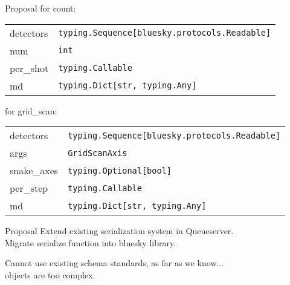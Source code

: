 \documentclass{presentation}
\begin{document}
\begin{frame}{Proposal}
  for count:
  \begin{tabular}{ l | l }
    detectors & \texttt{typing.Sequence[bluesky.protocols.Readable]} \\
    num & \texttt{int} \\
    per\_shot & \texttt{typing.Callable} \\
    md & \texttt{typing.Dict[str, typing.Any]} \\
  \end{tabular}

  \vfill

  for grid\_scan:
  \begin{tabular}{ l | l }
    detectors & \texttt{typing.Sequence[bluesky.protocols.Readable]} \\
    args & \texttt{GridScanAxis} \\
    snake\_axes & \texttt{typing.Optional[bool]} \\
    per\_step & \texttt{typing.Callable} \\
    md & \texttt{typing.Dict[str, typing.Any]} \\
  \end{tabular}
\end{frame}

\begin{frame}{Proposal}
  Extend existing serialization system in Queueserver. \\
  Migrate serialize function into bluesky library.

  \vfill

  Cannot use existing schema standards, as far as we know... \\
  objects are too complex.

  \vfill
\end{frame}
\end{document}
